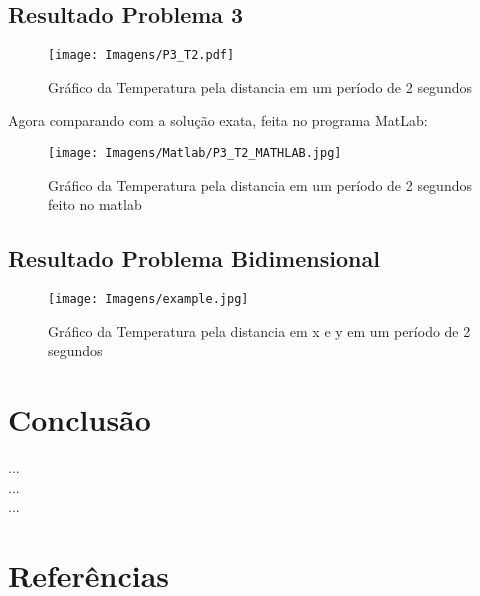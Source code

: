 \documentclass[final,5p,times,twocolumn]{elsarticle}
\begin{document}
\subsection{Resultado Problema 3}
\label{sec:ResultadoP3}

\begin{figure}[h]
    \centering
    \texttt{[image: Imagens/P3\_T2.pdf]}
    \caption{Gráfico da Temperatura pela distancia em um período de 2 segundos}
    \label{fig:mesh1}
\end{figure}

Agora comparando com a solução exata, feita no programa MatLab:

\begin{figure}[h]
    \centering
    \texttt{[image: Imagens/Matlab/P3\_T2\_MATHLAB.jpg]}
    \caption{Gráfico da Temperatura pela distancia em um período de 2 segundos feito no matlab}
    \label{fig:mesh1}
\end{figure}

\subsection{Resultado Problema Bidimensional}

\begin{figure}[h]
    \centering
    \texttt{[image: Imagens/example.jpg]}
    \caption{Gráfico da Temperatura pela distancia em x e y em um período de 2 segundos}
    \label{fig:mesh1}
\end{figure}

\section{Conclusão}

...\\
...\\
...\\




\section*{Referências}


\end{document}
